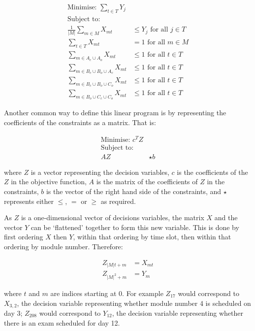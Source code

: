 \begin{align}
\text{Minimise: } \sum_{t \in T} Y_j & \label{eqn:objective_modules} \\
\text{Subject to: } & \nonumber \\
\frac{1}{|M|} \sum_{m \in M} X_{mt} &\leq Y_j \text{ for all } j \in T \label{eqn:auxiliary} \\
\sum_{t \in T} X_{mt} &= 1 \text{ for all } m \in M \label{eqn:schedule_all_modules} \\
\sum_{m \in A_c \cup A_o} X_{mt} &\leq 1 \text{ for all } t \in T \label{eqn:clique1} \\
\sum_{m \in B_c \cup B_o \cup A_c} X_{mt} &\leq 1 \text{ for all } t \in T \label{eqn:clique2} \\
\sum_{m \in B_c \cup B_o \cup C_o} X_{mt} &\leq 1 \text{ for all } t \in T \label{eqn:clique3} \\
\sum_{m \in B_o \cup C_c \cup C_o} X_{mt} &\leq 1 \text{ for all } t \in T \label{eqn:clique4}
\end{align}

Another common way to define this linear program is by representing the
coefficients of the constraints as a matrix.
That is:

\begin{align}
\text{Minimise: } c^T Z & \\
\text{Subject to: } & \nonumber \\
A Z & \star b
\end{align}

where \(Z\) is a vector representing the decision variables, \(c\) is the
coefficients of the \(Z\) in the objective function, \(A\) is the matrix of the
coefficients of \(Z\) in the constraints, \(b\) is the vector of the right hand
side of the constraints, and \(\star\) represents either \(\leq\), \(=\) or
\(\geq\) as required.

As \(Z\) is a one-dimensional vector of decisions variables,
the matrix \(X\) and the vector \(Y\) can be `flattened' together to form this new variable.
This is done by first ordering \(X\) then \(Y\), within that
ordering by time slot, then within that ordering by module number.
Therefore:

\begin{align}
Z_{|M|t + m} &= X_{mt}\\
Z_{|M|^2 + m} &= Y_m
\end{align}

where \(t\) and \(m\) are indices starting at 0.
For example \(Z_{17}\) would correspond to \(X_{3, 2}\), the decision variable
representing whether module number 4 is scheduled on day 3; \(Z_{208}\) would
correspond to \(Y_{12}\), the decision variable representing whether there is an
exam scheduled for day 12.

